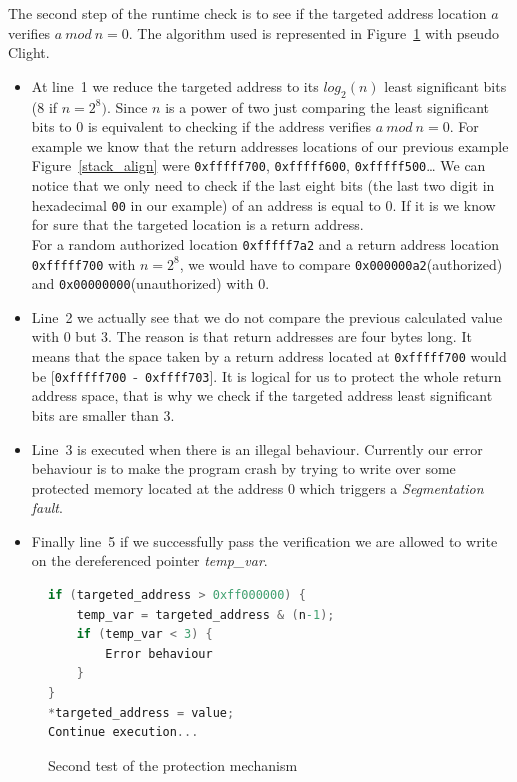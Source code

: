\documentclass[11pt]{sdm}
\begin{document}
The second step of the runtime check is to see if the targeted address location $a$ verifies $a~mod~n=0$.
The algorithm used is represented in Figure~\ref{classic_check} with pseudo Clight.
\begin{itemize}
	\item At line~1 we reduce the targeted address to its $log_2(n)$ least significant bits (8 if $n=2^8)$.
Since $n$ is a power of two just comparing the least significant bits to $0$ is equivalent to checking if the address verifies $a~mod~n=0$.
For example we know that the return addresses locations of our previous example Figure~\ref{stack_align} were \texttt{0xfffff700}, \texttt{0xfffff600}, \texttt{0xfffff500}\dots
We can notice that we only need to check if the last eight bits (the last two digit in hexadecimal \texttt{00} in our example) of an address is equal to 0.
If it is we know for sure that the targeted location is a return address.\\
For a random authorized location \texttt{0xfffff7a2} and a return address location \texttt{0xfffff700} with $n=2^8$, we would have to compare \texttt{0x000000a2}(authorized) and \texttt{0x00000000}(unauthorized) with $0$. 
	\item Line~2 we actually see that we do not compare the previous calculated value with 0 but 3. The reason is that return addresses are four bytes long.
		It means that the space taken by a return address located at \texttt{0xfffff700} would be [\texttt{0xfffff700}~-~\texttt{0xffff703}]. It is logical for us to protect the whole return address space, that is why we check if the targeted address least significant bits are smaller than 3.
	\item Line~3 is executed when there is an illegal behaviour. Currently our error behaviour is to make the program crash by trying to write over some protected memory located at the address 0 which triggers a \textit{Segmentation fault}.
	\item Finally line~5 if we successfully pass the verification we are allowed to write on the dereferenced pointer \textit{temp\_var}.
\end{itemize}

\begin{figure}[!ht]
\centering
\begin{lstlisting}[language=C]
if (targeted_address > 0xff000000) {
	temp_var = targeted_address & (n-1);
	if (temp_var < 3) {
		Error behaviour
	} 
}
*targeted_address = value;
Continue execution...
\end{lstlisting}
\caption{Second test of the protection mechanism}
\label{classic_check}
\end{figure}
\end{document}
